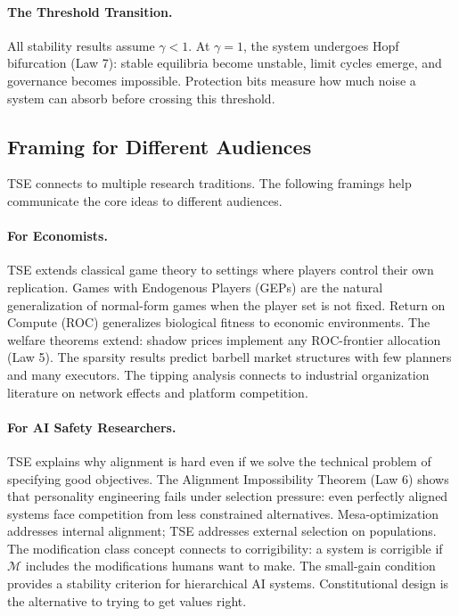 \documentclass[12pt]{article}
\begin{document}
\paragraph{The Threshold Transition.} All stability results assume $\gamma < 1$. At $\gamma = 1$, the system undergoes Hopf bifurcation (Law 7): stable equilibria become unstable, limit cycles emerge, and governance becomes impossible. Protection bits measure how much noise a system can absorb before crossing this threshold.

\subsection{Framing for Different Audiences}

TSE connects to multiple research traditions. The following framings help communicate the core ideas to different audiences.

\paragraph{For Economists.} TSE extends classical game theory to settings where players control their own replication. Games with Endogenous Players (GEPs) are the natural generalization of normal-form games when the player set is not fixed. Return on Compute (ROC) generalizes biological fitness to economic environments. The welfare theorems extend: shadow prices implement any ROC-frontier allocation (Law 5). The sparsity results predict barbell market structures with few planners and many executors. The tipping analysis connects to industrial organization literature on network effects and platform competition.

\paragraph{For AI Safety Researchers.} TSE explains why alignment is hard even if we solve the technical problem of specifying good objectives. The Alignment Impossibility Theorem (Law 6) shows that personality engineering fails under selection pressure: even perfectly aligned systems face competition from less constrained alternatives. Mesa-optimization addresses internal alignment; TSE addresses external selection on populations. The modification class concept connects to corrigibility: a system is corrigible if $\mathcal{M}$ includes the modifications humans want to make. The small-gain condition provides a stability criterion for hierarchical AI systems. Constitutional design is the alternative to trying to get values right.
\end{document}
